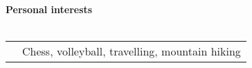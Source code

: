 \textbf{Personal interests}
\\
\\
\begin{tabular}{p{}|p{}}
&Chess, volleyball, travelling, mountain hiking\\
\end{tabular}
